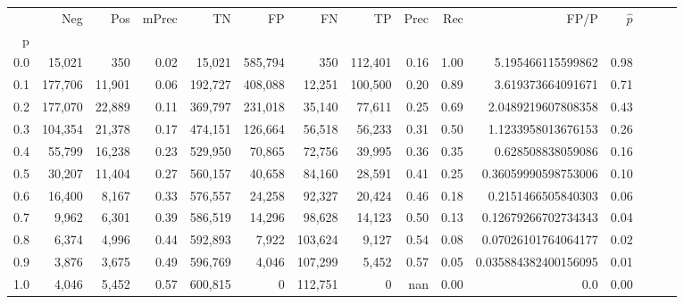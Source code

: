 \begin{tabular}{rrrrrrrrrrrrrrr}
\toprule
{} &      Neg &     Pos & mPrec &       TN &       FP &       FN &       TP &  Prec &   Rec &                  FP/P & $\hat{p}$ \\
p   &          &         &       &          &          &          &          &       &       &                       &           \\
\midrule
0.0 &   15,021 &     350 &  0.02 &   15,021 &  585,794 &      350 &  112,401 &  0.16 &  1.00 &     5.195466115599862 &      0.98 \\
0.1 &  177,706 &  11,901 &  0.06 &  192,727 &  408,088 &   12,251 &  100,500 &  0.20 &  0.89 &     3.619373664091671 &      0.71 \\
0.2 &  177,070 &  22,889 &  0.11 &  369,797 &  231,018 &   35,140 &   77,611 &  0.25 &  0.69 &    2.0489219607808358 &      0.43 \\
0.3 &  104,354 &  21,378 &  0.17 &  474,151 &  126,664 &   56,518 &   56,233 &  0.31 &  0.50 &    1.1233958013676153 &      0.26 \\
0.4 &   55,799 &  16,238 &  0.23 &  529,950 &   70,865 &   72,756 &   39,995 &  0.36 &  0.35 &     0.628508838059086 &      0.16 \\
0.5 &   30,207 &  11,404 &  0.27 &  560,157 &   40,658 &   84,160 &   28,591 &  0.41 &  0.25 &   0.36059990598753006 &      0.10 \\
0.6 &   16,400 &   8,167 &  0.33 &  576,557 &   24,258 &   92,327 &   20,424 &  0.46 &  0.18 &    0.2151466505840303 &      0.06 \\
0.7 &    9,962 &   6,301 &  0.39 &  586,519 &   14,296 &   98,628 &   14,123 &  0.50 &  0.13 &   0.12679266702734343 &      0.04 \\
0.8 &    6,374 &   4,996 &  0.44 &  592,893 &    7,922 &  103,624 &    9,127 &  0.54 &  0.08 &   0.07026101764064177 &      0.02 \\
0.9 &    3,876 &   3,675 &  0.49 &  596,769 &    4,046 &  107,299 &    5,452 &  0.57 &  0.05 &  0.035884382400156095 &      0.01 \\
1.0 &    4,046 &   5,452 &  0.57 &  600,815 &        0 &  112,751 &        0 &   nan &  0.00 &                   0.0 &      0.00 \\
\bottomrule
\end{tabular}
